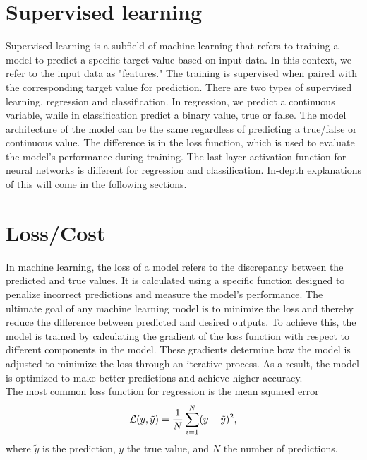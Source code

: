 \section{Supervised learning}
Supervised learning is a subfield of machine learning that refers to training a model to predict a specific target value based on input data.
In this context, we refer to the input data as "features." The training is supervised when paired with the corresponding target value for prediction.
There are two types of supervised learning, regression and classification. 
In regression, we predict a continuous variable, while in classification predict a binary value, true or false.
The model architecture of the model can be the same regardless of predicting a true/false or continuous value. 
The difference is in the loss function, which is used to evaluate the model's performance during training. The last layer activation function for neural networks is different for regression and classification. 
In-depth explanations of this will come in the following sections.

\section{Loss/Cost}
In machine learning, the loss of a model refers to the discrepancy between the predicted and true values.
It is calculated using a specific function designed to penalize incorrect predictions and measure the model's performance.
The ultimate goal of any machine learning model is to minimize the loss and thereby reduce the difference between predicted and desired outputs.
To achieve this, the model is trained by calculating the gradient of the loss function with respect to different components in the model.
These gradients determine how the model is adjusted to minimize the loss through an iterative process.
As a result, the model is optimized to make better predictions and achieve higher accuracy.\\

The most common loss function for regression is the mean squared error
\begin{equation} \label{eq:mse}
    \mathcal{L}(y, \Tilde{y}) = \frac{1}{N}\sum_{i=1}^N(y-\Tilde{y})^2,
\end{equation}
where $\tilde{y}$ is the prediction, $y$ the true value, and $N$ the number of predictions.

